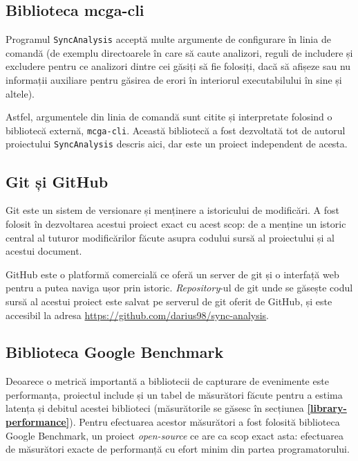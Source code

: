 \subsection{Biblioteca mcga-cli}

Programul \lstinline{SyncAnalysis} acceptă multe argumente de
configurare în linia de comandă (de exemplu directoarele în care să
caute analizori, reguli de includere și excludere pentru ce analizori
dintre cei găsiți să fie folosiți, dacă să afișeze sau nu informații
auxiliare pentru găsirea de erori în interiorul executabilului în sine
și altele).

Astfel, argumentele din linia de comandă sunt citite și interpretate
folosind o bibliotecă externă, \lstinline{mcga-cli}\cite{mcga-cli}.
Această bibliotecă a fost dezvoltată tot de autorul proiectului
\lstinline{SyncAnalysis} descris aici, dar este un proiect independent
de acesta.

\subsection{Git și GitHub}

Git\cite{git} este un sistem de versionare și menținere a istoricului de
modificări. A fost folosit în dezvoltarea acestui proiect exact cu acest
scop: de a menține un istoric central al tuturor modificărilor făcute
asupra codului sursă al proiectului și al acestui document.

GitHub\cite{GitHub} este o platformă comercială ce oferă un server de
git și o interfață web pentru a putea naviga ușor prin istoric.
\textit{Repository}-ul de git unde se găsește codul sursă al acestui
proiect este salvat pe serverul de git oferit de GitHub, și este
accesibil la adresa \url{https://github.com/darius98/sync-analysis}.

\subsection{Biblioteca Google Benchmark}

Deoarece o metrică importantă a bibliotecii de capturare de evenimente
este performanța, proiectul include și un tabel de măsurători făcute
pentru a estima latența și debitul acestei biblioteci (măsurătorile se
găsesc în secțiunea \textbf{\ref{library-performance}}). Pentru
efectuarea acestor măsurători a fost folosită biblioteca Google
Benchmark\cite{GoogleBenchmark}, un proiect \textit{open-source} ce are
ca scop exact asta: efectuarea de măsurători exacte de performanță cu
efort minim din partea programatorului.
